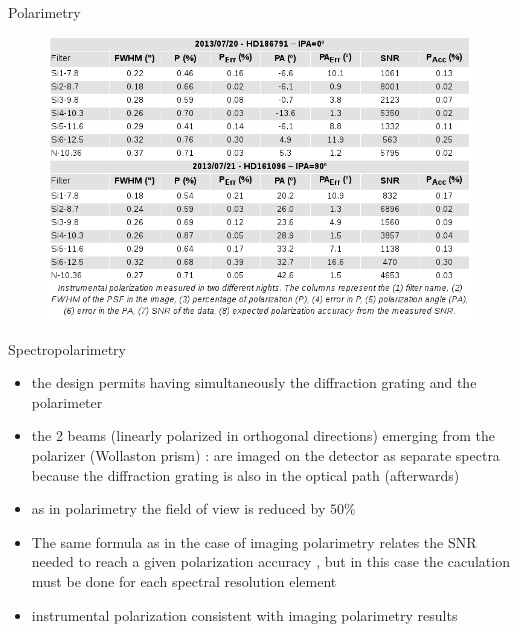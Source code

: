 \documentclass{beamer}
\begin{document}
\begin{frame}{Polarimetry}
\begin{figure}[H]
 \centering
 \includegraphics[scale=0.4]{img4.png}
\end{figure}
\end{frame}

\begin{frame}{Spectropolarimetry}
\begin{itemize}
\item the design permits having simultaneously the diffraction grating and the polarimeter
\item the 2 beams (linearly polarized in orthogonal directions) emerging from the polarizer (Wollaston prism) :  
are imaged on the detector as separate spectra because the diffraction grating is also in the optical path (afterwards)
\item as in polarimetry the field of view is reduced by $50\%$
\item The same formula as in the case of imaging polarimetry relates the SNR needed to reach a given polarization accuracy , 
but in this case the caculation must be done for each spectral resolution element
\item instrumental polarization consistent with imaging polarimetry results
\end{itemize}
\end{frame}
\end{document}
